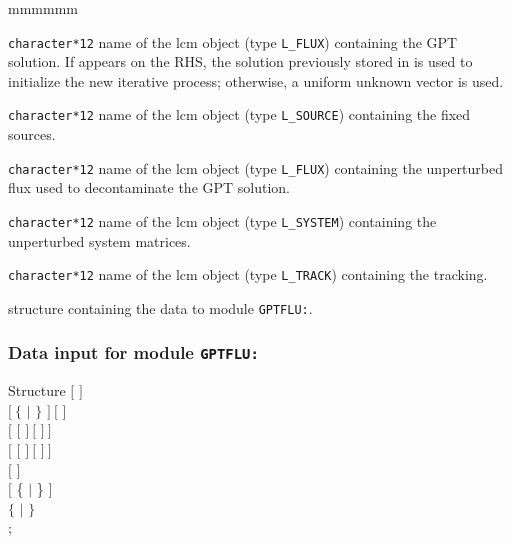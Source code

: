 \begin{ListeDeDescription}{mmmmmm}

\item[\dusa{FLUX\_GPT}] {\tt character*12} name of the {\sc lcm} object (type {\tt L\_FLUX}) containing the GPT solution. If  appears on the RHS, the solution previously stored in  is used to initialize the new iterative process; otherwise, a uniform unknown vector is used.

\item[\dusa{GPT}] {\tt character*12} name of the {\sc lcm} object (type {\tt L\_SOURCE}) containing the fixed sources.

\item[\dusa{FLUX0}] {\tt character*12} name of the {\sc lcm} object (type {\tt L\_FLUX}) containing the unperturbed flux used to decontaminate the GPT solution.

\item[\dusa{SYST}] {\tt character*12} name of the {\sc lcm} object (type {\tt L\_SYSTEM}) containing the unperturbed system matrices.

\item[\dusa{TRACK}] {\tt character*12} name of the {\sc lcm} object (type {\tt L\_TRACK}) containing the {\sc tracking}.

\item[\dstr{gptflu\_data}] structure containing the data to module {\tt GPTFLU:}\label{sect:gptflu_data}.

\end{ListeDeDescription}

\vskip 0.2cm

\subsubsection{Data input for module {\tt GPTFLU:}}\label{sect:gptflu_data}

\begin{DataStructure}{Structure }
$[$   $]$ \\
$[~\{$  $|$  $\}$   $]~[$   $]$ \\
$[$   $[$  $]~[$  $]~]$ \\
$[$   $[$  $]~[$  $]~]$ \\
$[$   $]$ \\
$[$ \{  $|$  \} $]$ \\
 $\{$  $|$   $\}$ \\
;
\end{DataStructure}

